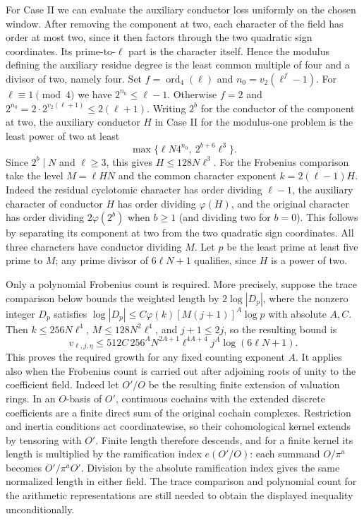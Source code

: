 \documentclass[11pt]{amsart}
\theoremstyle{definition}
\theoremstyle{remark}
\begin{document}
For Case II we can evaluate the auxiliary conductor loss uniformly
on the chosen window. After removing the component at two, each
character of the field has order at most two, since it then factors
through the two quadratic sign coordinates. Its prime-to-$\ell$
part is the character itself. Hence the modulus defining the
auxiliary residue degree is the least common multiple of four and
a divisor of two, namely four. Set $f=\operatorname{ord}_4(\ell)$
and $n_0=v_2(\ell^f-1)$. For $\ell\equiv1\pmod4$ we have
$2^{n_0}\le\ell-1$. Otherwise $f=2$ and
$2^{n_0}=2\cdot 2^{v_2(\ell+1)}\le2(\ell+1)$.
Writing $2^b$ for the conductor of the component at two, the
auxiliary conductor $H$ in Case II for the modulus-one problem
is the least power of two at least
\[
 \max\{\ell N4^{n_0},\ 2^{b+6}\ell^3\}.
\]
Since $2^b\mid N$ and $\ell\ge3$, this gives $H\le128N\ell^3$.
For the Frobenius comparison take the level $M=\ell HN$ and
the common character exponent $k=2(\ell-1)H$. Indeed the residual
cyclotomic character has order dividing $\ell-1$, the auxiliary
character of conductor $H$ has order dividing $\varphi(H)$, and
the original character has order dividing $2\varphi(2^b)$ when
$b\ge1$ (and dividing two for $b=0$). This follows by separating
its component at two from the two quadratic sign coordinates.
All three characters have conductor dividing $M$. Let $p$ be the
least prime at least five prime to $M$; any prime divisor of
$6\ell N+1$ qualifies, since $H$ is a power of two.

Only a polynomial Frobenius count is required. More precisely,
suppose the trace comparison below bounds the weighted length by
$2\log|D_p|$, where the nonzero integer $D_p$ satisfies
$\log|D_p|\le C\varphi(k)[M(j+1)]^A\log p$ with absolute
$A,C$. Then $k\le256N\ell^4$, $M\le128N^2\ell^4$, and $j+1\le2j$,
so the resulting bound is
\[
 v_{\ell,j,\eta}\le 512C\,256^A
 N^{2A+1}\ell^{4A+4}j^A\log(6\ell N+1).
\]
This proves the required growth for any fixed counting exponent $A$.
It applies also when the Frobenius count is carried out after
adjoining roots of unity to the coefficient field. Indeed let
$O'/O$ be the resulting finite extension of valuation rings.
In an $O$-basis of $O'$, continuous cochains with the extended
discrete coefficients are a finite direct sum of the original
cochain complexes. Restriction and inertia conditions act
coordinatewise, so their cohomological kernel extends by
tensoring with $O'$. Finite length therefore descends, and for
a finite kernel its length is multiplied by the ramification
index $e(O'/O)$: each summand $O/\pi^a$ becomes
$O'/\pi^aO'$. Division by the absolute ramification index gives
the same normalized length in either field. The trace comparison
and polynomial count for the arithmetic representations are still
needed to obtain the displayed inequality unconditionally.
\end{document}
